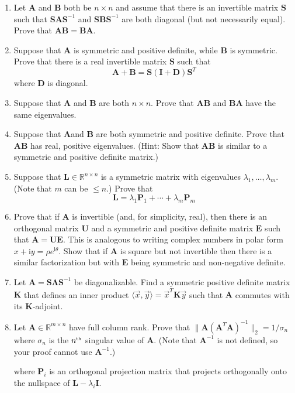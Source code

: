 \documentclass[11pt,fleqn]{article}
\newcommand{\mat}[1]{\mathbf{#1}}
\newcommand{\imag}{\mathrm{i}}
\begin{document}
\begin{enumerate}
\item Let $\mathbf{A}$ and $\mathbf{B}$ both be $n\times n$ and assume that there is an invertible matrix $\mathbf{S}$ such that $\mathbf{SAS}^{-1}$ and  $\mathbf{SBS}^{-1}$ are both diagonal (but not necessarily equal). Prove that $\mathbf{AB} = \mathbf{BA}$.

\item Suppose that $\mathbf{A}$ is symmetric and positive definite, while $\mathbf{B}$ is symmetric. Prove that there is a real invertible matrix $\mathbf{S}$ such that
\[\mathbf{A} + \mathbf{B} = \mathbf{S}\left(\mathbf{I} + \mathbf{D}\right)\mathbf{S}^T\]
where $\mathbf{D}$ is diagonal.

\item Suppose that $\mathbf{A}$ and $\mathbf{B}$ are both $n\times n$. Prove that $\mathbf{AB}$ and $\mathbf{BA}$ have the same eigenvalues. %

\item Suppose that $\mathbf{A}$and $\mathbf{B}$ are both symmetric and positive definite. Prove that $\mathbf{AB}$ has real, positive eigenvalues. (Hint: Show that {\bf AB} is similar to a symmetric and positive definite matrix.)

\item Suppose that $\mathbf{L}\in\mathbb{R}^{n\times n}$ is a symmetric matrix with eigenvalues $\lambda_1,\ldots,\lambda_m$. (Note that $m$ can be $\le n$.) Prove that
\[\mathbf{L} = \lambda_1 \mathbf{P}_1 + \cdots+\lambda_m\mathbf{P}_m\]

\item Prove that if $\mathbf{A}$ is invertible (and, for simplicity, real), then there is an orthogonal matrix $\mathbf{U}$ and a symmetric and positive definite matrix $\mathbf{E}$ such that $\mathbf{A} = \mathbf{UE}$. This is analogous to writing complex numbers in polar form $x+\imag y = \rho e^{\imag \theta}$. Show that if $\mathbf{A}$ is square but not invertible then there is a similar factorization but with $\mathbf{E}$ being symmetric and non-negative definite.

\item Let $\mathbf{A} = \mathbf{S\Lambda S}^{-1}$ be diagonalizable. Find a symmetric positive definite matrix $\mathbf{K}$ that defines an inner product $\langle\vec{x},\vec{y}\rangle =\vec{x}^T\mat{K}\vec{y}$ such that $\mathbf{A}$ commutes with its $\mat{K}$-adjoint.

\item Let $\mat{A}\in\mathbb{R}^{m\times n}$ have full column rank. Prove that $\|\mat{A}(\mat{A}^T\mat{A})^{-1}\|_2=1/\sigma_n$ where $\sigma_n$ is the $n^{\mbox{\tiny th}}$ singular value of $\mat{A}$. (Note that $\mat{A}^{-1}$ is not defined, so your proof cannot use $\mat{A}^{-1}$.)

where $\mathbf{P}_i$ is an orthogonal projection matrix that projects orthogonally onto the nullspace of $\mathbf{L} - \lambda_i\mathbf{I}$.
\end{enumerate}
 
\end{document}
